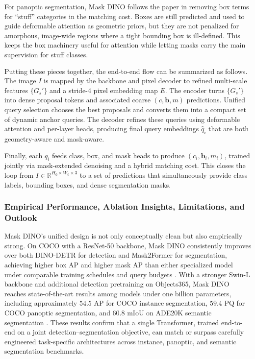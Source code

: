 \begin{enrichment}
\begin{enrichment}
		For panoptic segmentation, Mask DINO follows the paper in removing box terms for ``stuff'' categories in the matching cost.
		Boxes are still predicted and used to guide deformable attention as geometric priors, but they are not penalized for amorphous, image-wide regions where a tight bounding box is ill-defined.
		This keeps the box machinery useful for attention while letting masks carry the main supervision for stuff classes.
		
		\medskip
		
		Putting these pieces together, the end-to-end flow can be summarized as follows.
		The image $I$ is mapped by the backbone and pixel decoder to refined multi-scale features $\{G_s'\}$ and a stride-4 pixel embedding map $E$.
		The encoder turns $\{G_s'\}$ into dense proposal tokens and associated coarse $(c,\mathbf{b},m)$ predictions.
		Unified query selection chooses the best proposals and converts them into a compact set of dynamic anchor queries.
		The decoder refines these queries using deformable attention and per-layer heads, producing final query embeddings $\hat q_i$ that are both geometry-aware and mask-aware.
		
		\newpage
		
		Finally, each $\hat q_i$ feeds class, box, and mask heads to produce $(c_i,\mathbf{b}_i,m_i)$, trained jointly via mask-extended denoising and a hybrid matching cost.
		This closes the loop from $I \in \mathbb{R}^{H_0 \times W_0 \times 3}$ to a set of predictions that simultaneously provide class labels, bounding boxes, and dense segmentation masks.
		
		\subsubsection{Empirical Performance, Ablation Insights, Limitations, and Outlook}
		\label{subsubsec:chapter15_maskdino_performance}
		
		Mask DINO’s unified design is not only conceptually clean but also empirically strong. On COCO with a ResNet-50 backbone, Mask DINO consistently improves over both DINO-DETR for detection and Mask2Former for segmentation, achieving higher box AP and higher mask AP than either specialized model under comparable training schedules and query budgets \cite{li2022_maskdino,zhang2022_dino,ke2023_hqsam}. With a stronger Swin-L backbone and additional detection pretraining on Objects365, Mask DINO reaches state-of-the-art results among models under one billion parameters, including approximately \(54.5\) AP for COCO instance segmentation, \(59.4\) PQ for COCO panoptic segmentation, and \(60.8\) mIoU on ADE20K semantic segmentation \cite{li2022_maskdino}. These results confirm that a single Transformer, trained end-to-end on a joint detection–segmentation objective, can match or surpass carefully engineered task-specific architectures across instance, panoptic, and semantic segmentation benchmarks.
		

\end{enrichment}
\end{enrichment}
